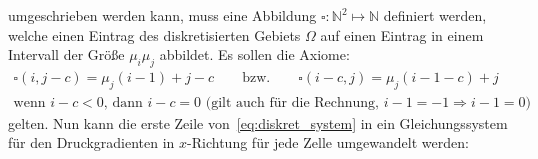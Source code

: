 umgeschrieben werden kann, muss eine Abbildung $\square:\mathbb{N}^{2} \mapsto \mathbb{N}$ definiert werden, welche einen Eintrag des diskretisierten Gebiets $\Omega$ auf einen Eintrag in einem Intervall der Größe $\mu_i \mu_j$ abbildet. Es sollen die Axiome:
\begin{align*}
    \square(i,j-c) = \mu_j (i-1) + j - c \qquad \text{bzw.} \qquad \square(i-c,j) = \mu_j (i-1-c) + j \\
    \text{wenn } i-c < 0 \text{, dann } i-c = 0 \text{ (gilt auch für die Rechnung, $i-1=-1\Rightarrow i-1 = 0$)}
\end{align*}
gelten. Nun kann die erste Zeile von~\eqref{eq:diskret_system} in ein Gleichungssystem für den Druckgradienten in $x$-Richtung für jede Zelle umgewandelt werden:
